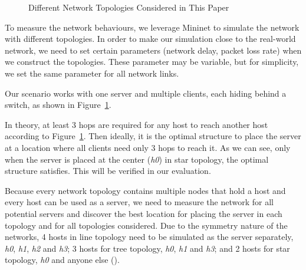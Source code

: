 \begin{figure}[ht]

\caption{Different Network Topologies Considered in This Paper} 
\label{fig:topo}
\end{figure}

To measure the network behaviours, we leverage Mininet \cite{Mininet:official}
to simulate the network with different topologies. In order to make our simulation
close to the real-world network, we need to set certain parameters (\eg network 
delay, packet loss rate) when we construct the topologies. These parameter may be
variable, but for simplicity, we set the same parameter for all network links. 

Our scenario works with one server and multiple clients, each hiding behind a 
switch, as shown in Figure~\ref{fig:topo}.

In theory, at least 3 hops are required for any host to reach another host according
to Figure~\ref{fig:topo}. Then ideally, it is the optimal structure to place the server 
at a location where all clients need only 3 hops to reach it. As we can see, only 
when the server is placed at the center ({\it h0}) in star topology, the optimal 
structure satisfies. This will be verified in our evaluation.

Because every network topology contains multiple nodes that hold a host and every 
host can be used as a server, we need to measure the network for all potential servers
and discover the best location for placing the server in each topology and for all
topologies considered. Due to the symmetry nature of the networks, 4 hosts in line topology
need to be simulated as the server separately, {\it h0}, {\it h1}, {\it h2} and 
{\it h3}; 3 hosts for tree topology, {\it h0}, {\it h1} and {\it h3}; and 
2 hosts for star topology, {\it h0} and anyone else (). 

